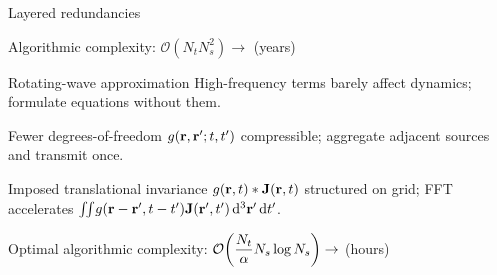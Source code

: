 \documentclass[aspectratio=169, usenames, dvipsnames]{beamer}
\begin{document}
\begin{frame}{Layered redundancies}
  \begin{center}
    Algorithmic complexity: $\displaystyle\mathcal{O}(N_t N_s^2) \to$ \alert{(years)}
  \end{center}
  \begin{block}{Rotating-wave approximation}
    High-frequency terms barely affect dynamics; formulate equations without them.
  \end{block}
  \begin{block}{Fewer degrees-of-freedom}
    $g(\vb{r}, \vb{r}'; t, t')$ compressible; aggregate adjacent sources and transmit once.
  \end{block}
  \begin{block}{Imposed translational invariance}
    $g(\vb{r}, t) * \vb{J}(\vb{r}, t)$ structured on grid; FFT accelerates $\iint_{}g(\vb{r} - \vb{r}', t - t') \vb{J}(\vb{r'}, t') \dd[3]{\vb{r}'} \dd{t'}$.
  \end{block}
  \begin{center}
    Optimal algorithmic complexity: $\displaystyle\mathcal{O}\qty(\frac{N_t}{\alpha} N_s \log N_s) \to$ \alert{(hours)}
  \end{center}
\end{frame}
\end{document}
